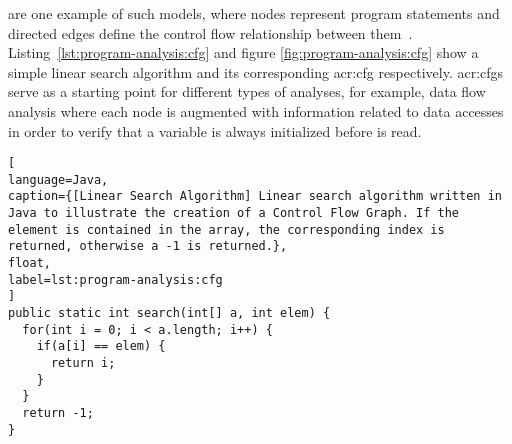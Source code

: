 \textit{} are one example of such models, where nodes represent program statements and directed edges define the control flow relationship between them~\cite{Allen1970}. Listing~\ref{lst:program-analysis:cfg} and figure \ref{fig:program-analysis:cfg} show a simple linear search algorithm and its corresponding \acrlong{acr:cfg} respectively. \acrshort{acr:cfg}s serve as a starting point for different types of analyses, for example, data flow analysis where each node is augmented with information related to data accesses in order to verify that a variable is always initialized before is read. 

\begin{lstlisting}[
language=Java,
caption={[Linear Search Algorithm] Linear search algorithm written in Java to illustrate the creation of a Control Flow Graph. If the element is contained in the array, the corresponding index is returned, otherwise a -1 is returned.},
float,
label=lst:program-analysis:cfg
]
public static int search(int[] a, int elem) {
  for(int i = 0; i < a.length; i++) {
    if(a[i] == elem) {
      return i;
    }
  }
  return -1;
}
\end{lstlisting}

